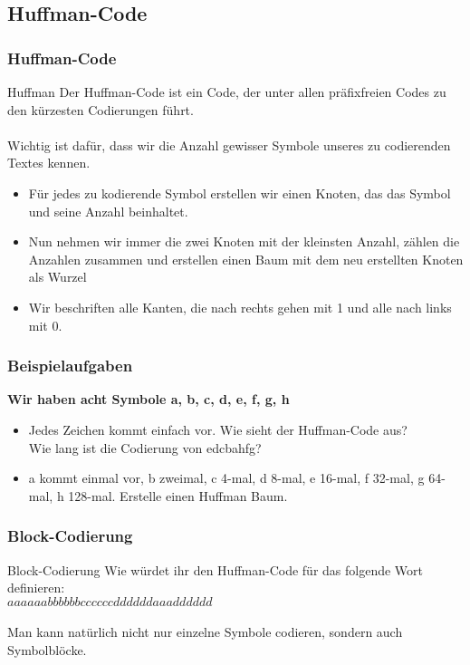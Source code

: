 \documentclass{beamer}
\begin{document}
\subsection{Huffman-Code}
\begin{frame}
	\frametitle{Huffman-Code}
	\begin{block}{Huffman}
		Der Huffman-Code ist ein Code, der unter allen präfixfreien 			Codes zu den kürzesten Codierungen führt.\\
		\hfill\\
		Wichtig ist dafür, dass wir die Anzahl gewisser Symbole 				unseres zu codierenden Textes kennen.\\
		\pause
		\begin{itemize}
			\item Für jedes zu kodierende Symbol erstellen wir einen 				Knoten, das das Symbol und seine Anzahl beinhaltet.
			\item Nun nehmen wir immer die zwei Knoten mit der 						kleinsten Anzahl, zählen die Anzahlen zusammen und 						erstellen einen Baum mit dem neu erstellten Knoten als 					Wurzel
			\item Wir beschriften alle Kanten, die nach rechts gehen 				mit 1 und alle nach links mit 0.
		\end{itemize}
	\end{block}
\end{frame}

\begin{frame}
	\frametitle{Beispielaufgaben}
	\begin{block}{\bf Wir haben acht Symbole a, b, c, d, e, f, g, h}
		\begin{itemize}
			\item Jedes Zeichen kommt einfach vor. Wie sieht der 					Huffman-Code aus?\\
			Wie lang ist die Codierung von edcbahfg?\pause
			\item a kommt einmal vor, b zweimal, c 4-mal, d 8-mal, e 				16-mal, f 32-mal,
			g 64-mal, h 128-mal. Erstelle einen Huffman Baum.
		\end{itemize}
	\end{block}
\end{frame}

\begin{frame}
	\frametitle{Block-Codierung}
	\begin{block}{Block-Codierung}
		Wie würdet ihr den Huffman-Code für das folgende Wort 					definieren:\\
		$aaaaaabbbbbbccccccddddddaaadddddd$
		\pause		
		\\
		\hfill\\
		Man kann natürlich nicht nur einzelne Symbole codieren, 				sondern auch Symbolblöcke.
	\end{block}
\end{frame}
\end{document}
